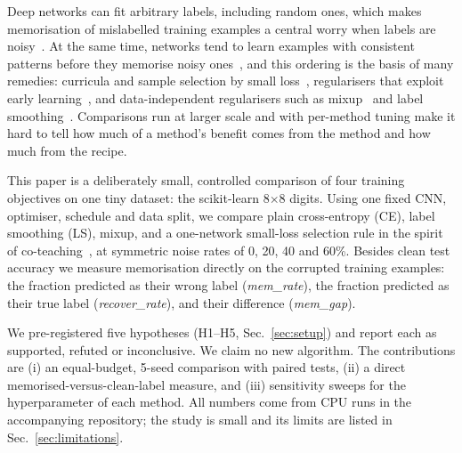Deep networks can fit arbitrary labels, including random ones, which makes memorisation of mislabelled training examples a central worry when labels are noisy~\cite{zhang2016understanding}. At the same time, networks tend to learn examples with consistent patterns before they memorise noisy ones~\cite{arpit2017closer}, and this ordering is the basis of many remedies: curricula and sample selection by small loss~\cite{jiang2017mentornet,han2018co,li2020dividemix}, regularisers that exploit early learning~\cite{liu2020early}, and data-independent regularisers such as mixup~\cite{zhang2017mixup} and label smoothing~\cite{mller2019when}. Comparisons run at larger scale and with per-method tuning make it hard to tell how much of a method's benefit comes from the method and how much from the recipe.

This paper is a deliberately small, controlled comparison of four training objectives on one tiny dataset: the scikit-learn 8$\times$8 digits. Using one fixed CNN, optimiser, schedule and data split, we compare plain cross-entropy (CE), label smoothing (LS), mixup, and a one-network small-loss selection rule in the spirit of co-teaching~\cite{han2018co}, at symmetric noise rates of 0, 20, 40 and 60\%. Besides clean test accuracy we measure memorisation directly on the corrupted training examples: the fraction predicted as their wrong label (\emph{mem\_rate}), the fraction predicted as their true label (\emph{recover\_rate}), and their difference (\emph{mem\_gap}).

We pre-registered five hypotheses (H1--H5, Sec.~\ref{sec:setup}) and report each as supported, refuted or inconclusive. We claim no new algorithm. The contributions are (i) an equal-budget, 5-seed comparison with paired tests, (ii) a direct memorised-versus-clean-label measure, and (iii) sensitivity sweeps for the hyperparameter of each method. All numbers come from CPU runs in the accompanying repository; the study is small and its limits are listed in Sec.~\ref{sec:limitations}.

